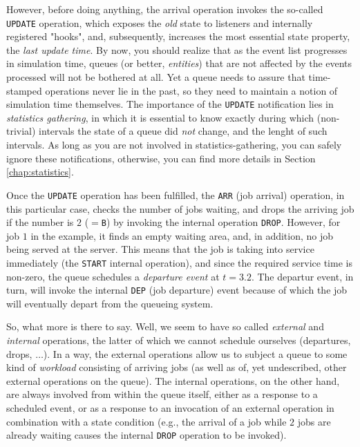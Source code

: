 However, before doing anything,
the arrival operation invokes
the so-called \lstinline|UPDATE| operation,
which exposes the {\em old\/} state
to listeners and internally registered "hooks",
and, subsequently, increases the most essential state
property, the {\em last update time}.
By now, you should realize that
as the event list progresses in simulation time,
queues (or better, {\em entities\/})
that are not affected by the events processed
will not be bothered at all.
Yet a queue needs to assure that time-stamped operations
never lie in the past,
so they need to maintain a notion of simulation time themselves.
The importance of the \lstinline|UPDATE| notification
lies in {\em statistics gathering},
in which it is essential to know exactly
during which (non-trivial) intervals
the state of a queue did {\em not\/} change,
and the lenght of such intervals.
As long as you are not involved in statistics-gathering,
you can safely ignore these notifications,
otherwise,
you can find more details in Section \ref{chap:statistics}.

Once the \lstinline|UPDATE| operation has been
fulfilled, the \lstinline|ARR| (job arrival) operation,
in this particular case,
checks the number of jobs waiting,
and drops the arriving job if the number is $2$ ($=$\lstinline|B|)
by invoking the internal operation \lstinline|DROP|.
However, for job $1$ in the example,
it finds an empty waiting area,
and, in addition, no job being served at the server.
This means that the job is taking into service immediately
(the \lstinline|START| internal operation),
and since the required service time is non-zero,
the queue schedules a {\em departure event\/}
at $t=3.2$.
The departur event, in turn,
will invoke the internal \lstinline|DEP| (job departure)
event because of which the job
will eventually depart from the queueing system.

So, what more is there to say.
Well, we seem to have so called {\em external\/}
and {\em internal\/} operations,
the latter of which we cannot schedule ourselves
(departures, drops, $\ldots$).
In a way, the external operations allow us
to subject a queue to some kind of {\em workload\/}
consisting of arriving jobs
(as well as of, yet undescribed, other external operations on the queue).
The internal operations, on the other hand,
are always involved from within the queue itself,
either as a response to a scheduled event,
or as a response to an invocation of an external operation
in combination with a state condition
(e.g., the arrival of a job while $2$ jobs are already waiting
causes the internal \lstinline|DROP| operation to be invoked).

